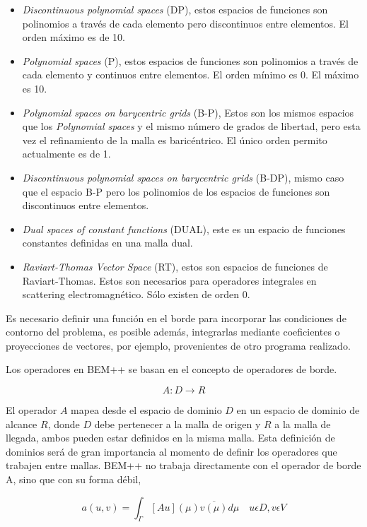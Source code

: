 \documentclass[12pt,letterpaper]{article}
\numberwithin{equation}{section}
\begin{document}
\begin{itemize}
	\item \textit{Discontinuous polynomial spaces} (DP), estos espacios de funciones son polinomios a través de cada elemento pero discontinuos entre elementos. El orden máximo es de 10.
	\item \textit{Polynomial spaces} (P), estos espacios de funciones son polinomios a través de cada elemento y continuos entre elementos. El orden mínimo es 0. El máximo es 10.
	\item \textit{Polynomial spaces on barycentric grids} (B-P), Estos son los mismos espacios que los \textit{Polynomial spaces} y el mismo número de grados de libertad, pero esta vez el refinamiento de la malla es baricéntrico. El único orden permito actualmente es de 1.
	\item \textit{Discontinuous polynomial spaces on barycentric grids} (B-DP), mismo caso que el espacio B-P pero los polinomios de los espacios de funciones son discontinuos entre elementos.
	\item \textit{Dual spaces of constant functions} (DUAL), este es un espacio de funciones constantes definidas en una malla dual.
	\item \textit{Raviart-Thomas Vector Space} (RT), estos son espacios de funciones de Raviart-Thomas. Estos son necesarios para operadores integrales en scattering electromagnético. Sólo existen de orden 0.
\end{itemize}

Es necesario definir una función en el borde para incorporar las condiciones de contorno del problema, es posible además, integrarlas mediante coeficientes o proyecciones de vectores, por ejemplo, provenientes de otro programa realizado.

Los operadores en BEM++ se basan en el concepto de operadores de borde.

$$A\colon D\rightarrow R$$

El operador $A$ mapea desde el espacio de dominio $D$ en un espacio de dominio de alcance $R$, donde $D$ debe pertenecer a la malla de origen y $R$ a la malla de llegada, ambos pueden estar definidos en la misma malla. Esta definición de dominios será de gran importancia al momento de definir los operadores que trabajen entre mallas. BEM++ no trabaja directamente con el operador de borde A, sino que con su forma débil,

$$a(u,v)=\int_{\Gamma}\left[ Au\right](\mu) \overline{v(\mu)} d\mu \quad u\epsilon D,v\epsilon V $$
\end{document}
